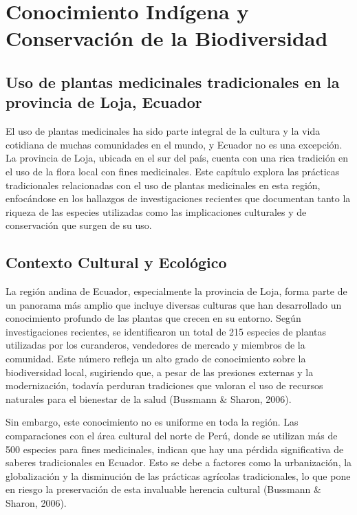 \documentclass[
  letterpaper,
  DIV=11,
  numbers=noendperiod,
  oneside]{scrreprt}
\begin{document}
\chapter{Conocimiento Indígena y Conservación de la
Biodiversidad}\label{conocimiento-induxedgena-y-conservaciuxf3n-de-la-biodiversidad}

\section{Uso de plantas medicinales tradicionales en la provincia de
Loja,
Ecuador}\label{uso-de-plantas-medicinales-tradicionales-en-la-provincia-de-loja-ecuador}

El uso de plantas medicinales ha sido parte integral de la cultura y la
vida cotidiana de muchas comunidades en el mundo, y Ecuador no es una
excepción. La provincia de Loja, ubicada en el sur del país, cuenta con
una rica tradición en el uso de la flora local con fines medicinales.
Este capítulo explora las prácticas tradicionales relacionadas con el
uso de plantas medicinales en esta región, enfocándose en los hallazgos
de investigaciones recientes que documentan tanto la riqueza de las
especies utilizadas como las implicaciones culturales y de conservación
que surgen de su uso.

\section{Contexto Cultural y
Ecológico}\label{contexto-cultural-y-ecoluxf3gico}

La región andina de Ecuador, especialmente la provincia de Loja, forma
parte de un panorama más amplio que incluye diversas culturas que han
desarrollado un conocimiento profundo de las plantas que crecen en su
entorno. Según investigaciones recientes, se identificaron un total de
215 especies de plantas utilizadas por los curanderos, vendedores de
mercado y miembros de la comunidad. Este número refleja un alto grado de
conocimiento sobre la biodiversidad local, sugiriendo que, a pesar de
las presiones externas y la modernización, todavía perduran tradiciones
que valoran el uso de recursos naturales para el bienestar de la salud
(Bussmann \& Sharon, 2006).

Sin embargo, este conocimiento no es uniforme en toda la región. Las
comparaciones con el área cultural del norte de Perú, donde se utilizan
más de 500 especies para fines medicinales, indican que hay una pérdida
significativa de saberes tradicionales en Ecuador. Esto se debe a
factores como la urbanización, la globalización y la disminución de las
prácticas agrícolas tradicionales, lo que pone en riesgo la preservación
de esta invaluable herencia cultural (Bussmann \& Sharon, 2006).
\end{document}
